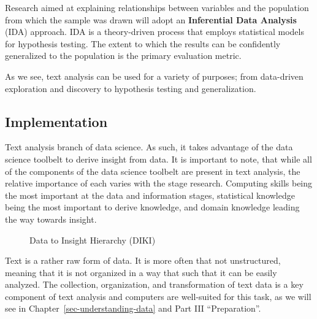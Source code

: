 \documentclass[
  letterpaper,
  DIV=11,
  numbers=noendperiod]{scrreprt}
\theoremstyle{definition}
\theoremstyle{remark}
\begin{document}
Research aimed at explaining relationships between variables and the
population from which the sample was drawn will adopt an
\textbf{Inferential Data Analysis} (IDA) approach. IDA is a
theory-driven process that employs statistical models for hypothesis
testing. The extent to which the results can be confidently generalized
to the population is the primary evaluation metric.

As we see, text analysis can be used for a variety of purposes; from
data-driven exploration and discovery to hypothesis testing and
generalization.

\subsection{Implementation}\label{implementation}

Text analysis branch of data science. As such, it takes advantage of the
data science toolbelt to derive insight from data. It is important to
note, that while all of the components of the data science toolbelt are
present in text analysis, the relative importance of each varies with
the stage research. Computing skills being the most important at the
data and information stages, statistical knowledge being the most
important to derive knowledge, and domain knowledge leading the way
towards insight.

\begin{figure}[H]


\caption{\label{fig-diki-hierarchy}Data to Insight Hierarchy (DIKI)}

\end{figure}%

Text is a rather raw form of data. It is more often that not
unstructured, meaning that it is not organized in a way that such that
it can be easily analyzed. The collection, organization, and
transformation of text data is a key component of text analysis and
computers are well-suited for this task, as we will see in
Chapter~\ref{sec-understanding-data} and Part III ``Preparation''.
\end{document}
